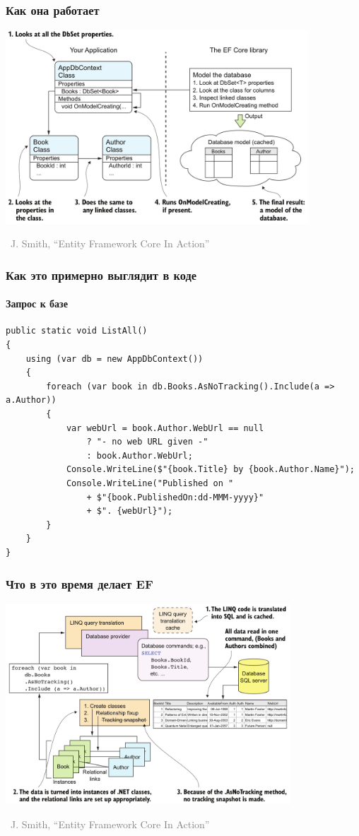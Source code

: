 \documentclass[xetex,mathserif,serif]{beamer}
\newcommand{\attribution}[1] {
\vspace{-5mm}\begin{flushright}\begin{scriptsize}\textcolor{gray}{\textcopyright\, #1}\end{scriptsize}\end{flushright}
}
\begin{document}
	\begin{frame}
		\frametitle{Как она работает}
		\begin{center}
			\includegraphics[width=0.85\textwidth]{efCoreDatabaseModeling.png}
			\attribution{J. Smith, ``Entity Framework Core In Action''}
		\end{center}
	\end{frame}

	\begin{frame}[fragile]
		\frametitle{Как это примерно выглядит в коде}
		\framesubtitle{Запрос к базе}
		\begin{footnotesize}
			\begin{verbatim}
public static void ListAll()
{
    using (var db = new AppDbContext())
    {
        foreach (var book in db.Books.AsNoTracking().Include(a => a.Author))
        {
            var webUrl = book.Author.WebUrl == null 
                ? "- no web URL given -" 
                : book.Author.WebUrl;
            Console.WriteLine($"{book.Title} by {book.Author.Name}");
            Console.WriteLine("Published on " 
                + $"{book.PublishedOn:dd-MMM-yyyy}" 
                + $". {webUrl}");
        }
    }
}
			\end{verbatim}
		\end{footnotesize}
	\end{frame}

	\begin{frame}
		\frametitle{Что в это время делает EF}
		\begin{center}
			\includegraphics[width=0.8\textwidth]{efCoreQuery.png}
			\attribution{J. Smith, ``Entity Framework Core In Action''}
		\end{center}
	\end{frame}
\end{document}
